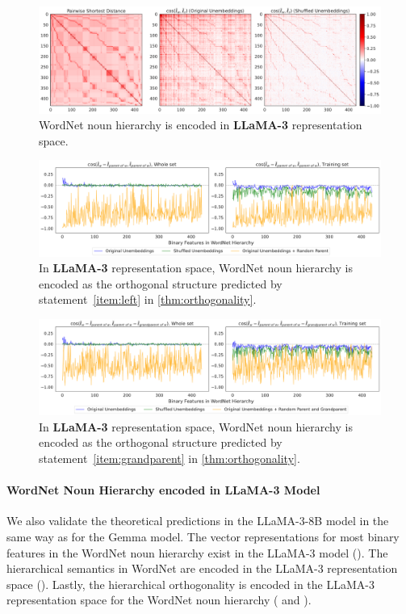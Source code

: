 \documentclass{article}
\begin{document}
\begin{figure}[t]
  \centering
  \includegraphics[width=1.0\linewidth]{figures/heatmap_noun_llama.pdf}
  \caption{WordNet noun hierarchy is encoded in \textbf{LLaMA-3} representation space.
  }
  \label{fig:heatmap_noun_llama}
\end{figure}


\begin{figure}[t]
  \centering
  \includegraphics[width=1.0\linewidth]{figures/hier_ortho_b_noun_llama.pdf}
  \caption{In \textbf{LLaMA-3} representation space, WordNet noun hierarchy is encoded as the orthogonal structure predicted by statement~\ref{item:left} in \cref{thm:orthogonality}.
  }
  \label{fig:hier_ortho_b_noun_llama}
\end{figure}


\begin{figure}[t]
  \centering
  \includegraphics[width=1.0\linewidth]{figures/hier_ortho_e_noun_llama.pdf}
  \caption{In \textbf{LLaMA-3} representation space, WordNet noun hierarchy is encoded as the orthogonal structure predicted by statement~\ref{item:grandparent} in \cref{thm:orthogonality}.
  }
  \label{fig:hier_ortho_e_noun_llama}
\end{figure}

\paragraph*{WordNet Noun Hierarchy encoded in LLaMA-3 Model}
We also validate the theoretical predictions in the LLaMA-3-8B model  in the same way as for the Gemma model.
The vector representations for most binary features in the WordNet noun hierarchy exist in the LLaMA-3 model ().
The hierarchical semantics in WordNet are encoded in the LLaMA-3 representation space ().
Lastly, the hierarchical orthogonality is encoded in the LLaMA-3 representation space for the WordNet noun hierarchy ( and ).
\end{document}

